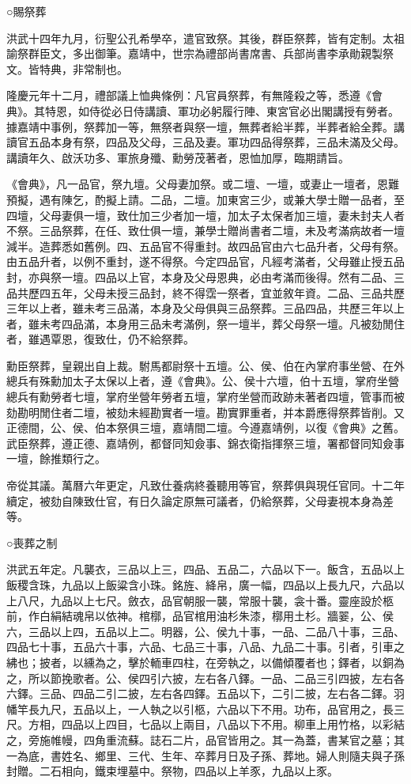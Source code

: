○賜祭葬

洪武十四年九月，衍聖公孔希學卒，遣官致祭。其後，群臣祭葬，皆有定制。太祖諭祭群臣文，多出御筆。嘉靖中，世宗為禮部尚書席書、兵部尚書李承勛親製祭文。皆特典，非常制也。

隆慶元年十二月，禮部議上恤典條例：凡官員祭葬，有無隆殺之等，悉遵《會典》。其特恩，如侍從必日侍講讀、軍功必躬履行陣、東宮官必出閣講授有勞者。據嘉靖中事例，祭葬加一等，無祭者與祭一壇，無葬者給半葬，半葬者給全葬。講讀官五品本身有祭，四品及父母，三品及妻。軍功四品得祭葬，三品未滿及父母。講讀年久、啟沃功多、軍旅身殲、勳勞茂著者，恩恤加厚，臨期請旨。

《會典》，凡一品官，祭九壇。父母妻加祭。或二壇、一壇，或妻止一壇者，恩難預擬，遇有陳乞，酌擬上請。二品，二壇。加東宮三少，或兼大學士贈一品者，至四壇，父母妻俱一壇，致仕加三少者加一壇，加太子太保者加三壇，妻未封夫人者不祭。三品祭葬，在任、致仕俱一壇，兼學士贈尚書者二壇，未及考滿病故者一壇減半。造葬悉如舊例。四、五品官不得重封。故四品官由六七品升者，父母有祭。由五品升者，以例不重封，遂不得祭。今定四品官，凡經考滿者，父母雖止授五品封，亦與祭一壇。四品以上官，本身及父母恩典，必由考滿而後得。然有二品、三品共歷四五年，父母未授三品封，終不得霑一祭者，宜並敘年資。二品、三品共歷三年以上者，雖未考三品滿，本身及父母俱與三品祭葬。三品四品，共歷三年以上者，雖未考四品滿，本身用三品未考滿例，祭一壇半，葬父母祭一壇。凡被劾閒住者，雖遇覃恩，復致仕，仍不給祭葬。

勳臣祭葬，皇親出自上裁。駙馬都尉祭十五壇。公、侯、伯在內掌府事坐營、在外總兵有殊勳加太子太保以上者，遵《會典》。公、侯十六壇，伯十五壇，掌府坐營總兵有勳勞者七壇，掌府坐營年勞者五壇，掌府坐營而政跡未著者四壇，管事而被劾勘明閒住者二壇，被劾未經勘實者一壇。勘實罪重者，并本爵應得祭葬皆削。又正德間，公、侯、伯本祭俱三壇，嘉靖間二壇。今遵嘉靖例，以復《會典》之舊。武臣祭葬，遵正德、嘉靖例，都督同知僉事、錦衣衛指揮祭三壇，署都督同知僉事一壇，餘推類行之。

帝從其議。萬曆六年更定，凡致仕養病終養聽用等官，祭葬俱與現任官同。十二年續定，被劾自陳致仕官，有日久論定原無可議者，仍給祭葬，父母妻視本身為差等。

○喪葬之制

洪武五年定。凡襲衣，三品以上三，四品、五品二，六品以下一。飯含，五品以上飯稷含珠，九品以上飯粱含小珠。銘旌、絳帛，廣一幅，四品以上長九尺，六品以上八尺，九品以上七尺。斂衣，品官朝服一襲，常服十襲，衾十番。靈座設於柩前，作白絹結魂帛以依神。棺槨，品官棺用油杉朱漆，槨用土杉。牆翣，公、侯六，三品以上四，五品以上二。明器，公、侯九十事，一品、二品八十事，三品、四品七十事，五品六十事，六品、七品三十事，八品、九品二十事。引者，引車之紼也；披者，以纁為之，擊於輀車四柱，在旁執之，以備傾覆者也；鐸者，以銅為之，所以節挽歌者。公、侯四引六披，左右各八鐸。一品、二品三引四披，左右各六鐸。三品、四品二引二披，左右各四鐸。五品以下，二引二披，左右各二鐸。羽幡竿長九尺，五品以上，一人執之以引柩，六品以下不用。功布，品官用之，長三尺。方相，四品以上四目，七品以上兩目，八品以下不用。柳車上用竹格，以彩結之，旁施帷幔，四角重流蘇。誌石二片，品官皆用之。其一為蓋，書某官之墓；其一為底，書姓名、鄉里、三代、生年、卒葬月日及子孫、葬地。婦人則隨夫與子孫封贈。二石相向，鐵束埋墓中。祭物，四品以上羊豕，九品以上豕。

